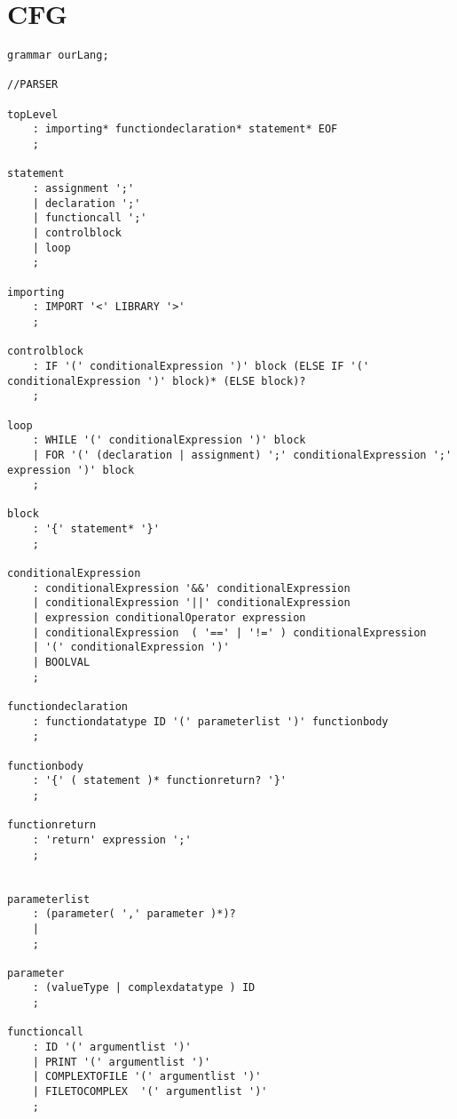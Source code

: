 \chapter{CFG}\label{app:CFG}
\begin{lstlisting}[caption={\acrshort{cfg} and Lexing rules},frame=tlrb,numbers=none]
grammar ourLang;

//PARSER

topLevel
    : importing* functiondeclaration* statement* EOF
    ;

statement
    : assignment ';'
    | declaration ';'
    | functioncall ';'
    | controlblock
    | loop
    ;

importing
    : IMPORT '<' LIBRARY '>'
    ; 

controlblock
    : IF '(' conditionalExpression ')' block (ELSE IF '(' conditionalExpression ')' block)* (ELSE block)?
    ;

loop
    : WHILE '(' conditionalExpression ')' block
    | FOR '(' (declaration | assignment) ';' conditionalExpression ';' expression ')' block
    ;

block
    : '{' statement* '}'
    ;
                                                                       
conditionalExpression                                                  
    : conditionalExpression '&&' conditionalExpression                 
    | conditionalExpression '||' conditionalExpression                 
    | expression conditionalOperator expression                        
    | conditionalExpression  ( '==' | '!=' ) conditionalExpression     
    | '(' conditionalExpression ')'                                    
    | BOOLVAL                                                          
    ;                                                                  
                                                                       
functiondeclaration
    : functiondatatype ID '(' parameterlist ')' functionbody
    ; 
    
functionbody
    : '{' ( statement )* functionreturn? '}'
    ;

functionreturn
    : 'return' expression ';'
    ;


parameterlist
    : (parameter( ',' parameter )*)?
    | 
    ;

parameter
    : (valueType | complexdatatype ) ID
    ;                                      
                                           
functioncall                               
    : ID '(' argumentlist ')'              
    | PRINT '(' argumentlist ')'           
    | COMPLEXTOFILE '(' argumentlist ')'   
    | FILETOCOMPLEX  '(' argumentlist ')'  
    ;                                      


\end{lstlisting}
